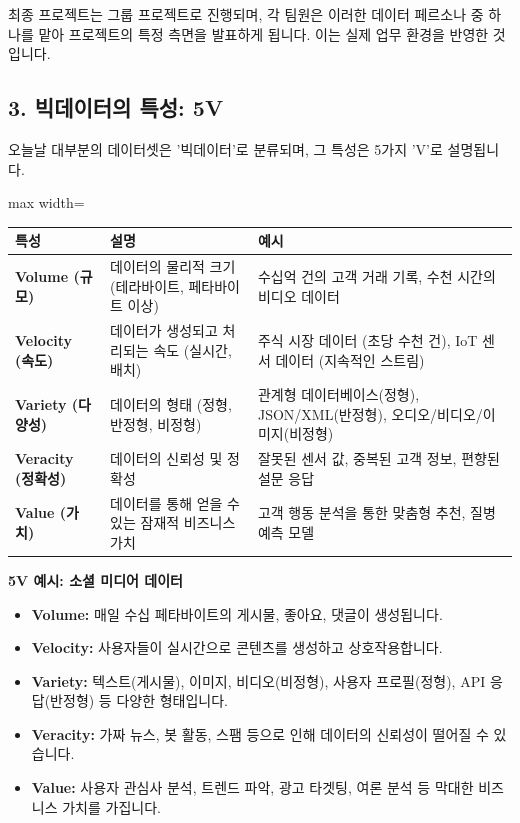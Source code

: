 \documentclass[11pt,a4paper]{article}
\theoremstyle{definition}
\begin{document}
\begin{infobox}
최종 프로젝트는 그룹 프로젝트로 진행되며, 각 팀원은 이러한 데이터 페르소나 중 하나를 맡아 프로젝트의 특정 측면을 발표하게 됩니다. 이는 실제 업무 환경을 반영한 것입니다.
\end{infobox}

\subsection*{3. 빅데이터의 특성: 5V}

오늘날 대부분의 데이터셋은 '빅데이터'로 분류되며, 그 특성은 5가지 'V'로 설명됩니다.

\begin{adjustbox}{max width=\textwidth}
\begin{tabular}{lll}
\toprule
\textbf{특성} & \textbf{설명} & \textbf{예시} \\
\midrule
\textbf{Volume (규모)} & 데이터의 물리적 크기 (테라바이트, 페타바이트 이상) & 수십억 건의 고객 거래 기록, 수천 시간의 비디오 데이터 \\
\textbf{Velocity (속도)} & 데이터가 생성되고 처리되는 속도 (실시간, 배치) & 주식 시장 데이터 (초당 수천 건), IoT 센서 데이터 (지속적인 스트림) \\
\textbf{Variety (다양성)} & 데이터의 형태 (정형, 반정형, 비정형) & 관계형 데이터베이스(정형), JSON/XML(반정형), 오디오/비디오/이미지(비정형) \\
\textbf{Veracity (정확성)} & 데이터의 신뢰성 및 정확성 & 잘못된 센서 값, 중복된 고객 정보, 편향된 설문 응답 \\
\textbf{Value (가치)} & 데이터를 통해 얻을 수 있는 잠재적 비즈니스 가치 & 고객 행동 분석을 통한 맞춤형 추천, 질병 예측 모델 \\
\bottomrule
\end{tabular}
\end{adjustbox}

\begin{examplebox}
\textbf{5V 예시: 소셜 미디어 데이터}
\begin{itemize}
    \item \textbf{Volume:} 매일 수십 페타바이트의 게시물, 좋아요, 댓글이 생성됩니다.
    \item \textbf{Velocity:} 사용자들이 실시간으로 콘텐츠를 생성하고 상호작용합니다.
    \item \textbf{Variety:} 텍스트(게시물), 이미지, 비디오(비정형), 사용자 프로필(정형), API 응답(반정형) 등 다양한 형태입니다.
    \item \textbf{Veracity:} 가짜 뉴스, 봇 활동, 스팸 등으로 인해 데이터의 신뢰성이 떨어질 수 있습니다.
    \item \textbf{Value:} 사용자 관심사 분석, 트렌드 파악, 광고 타겟팅, 여론 분석 등 막대한 비즈니스 가치를 가집니다.
\end{itemize}
\end{examplebox}
\end{document}
